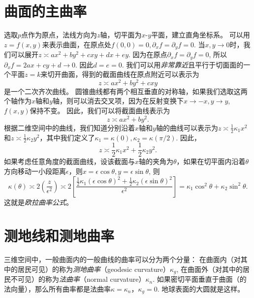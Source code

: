 \documentclass{article}
\begin{document}
\section{曲面的主曲率}

选取$p$点作为原点，法线方向为$z$轴，切平面为$x$-$y$平面，建立直角坐标系。
可以用$z=f(x,y)$来表示曲面，在原点处$f(0,0)=0, \partial_{x}f=\partial_{y}f=0$.
当$x, y\rightarrow 0$时，我们可以展开$z\asymp ax^{2}+by^{2}+cxy+dx+ey$.
因为在原点$\partial_{x}f=\partial_{y}f=0$, 所以$\partial_{x}f=2ax+cy+d\rightarrow 0$.
因此$d=e=0$.
我们可以用\emph{非常靠近}且平行于切面面的一个平面$z=k$来切开曲面，得到的截面曲线在原点附近可以表示为
\begin{equation}
    z\asymp ax^{2}+by^{2}+cxy
\end{equation}
是一个二次齐次曲线。
圆锥曲线都有两个相互垂直的对称轴，如果我们选取这两个轴作为$x$轴和$y$轴，则可以消去交叉项，因为在反射变换下$x\rightarrow -x, y\rightarrow y$, $f(x,y)$保持不变。
因此，我们可以将截面曲线表示为
\begin{equation}
    z\asymp ax^{2}+by^{2}.
\end{equation}
根据二维空间中的曲线，我们知道分别沿着$x$轴和$y$轴的曲线可以表示为$z\asymp \frac{1}{2}\kappa_{1}x^{2}$和$z\asymp \frac{1}{2}\kappa_{2}y^{2}$，其中我们定义了$\kappa_{1}=\kappa(0), \kappa_{2}=\kappa(\pi/2)$.
因此，
\begin{equation}
    z\asymp \frac{1}{2}\kappa_{1}x^{2}+\frac{1}{2}\kappa_{2}y^{2}.
\end{equation}
如果考虑任意角度的截面曲线，设该截面与$x$轴的夹角为$\theta$，如果在切平面内沿着$\theta$方向移动一小段距离$\epsilon$，则$x=\epsilon\cos\theta, y=\epsilon\sin\theta$, 则
\begin{equation}
    \kappa(\theta)
    \asymp 2\left(\frac{z}{\epsilon^{2}}\right)
    \asymp 2\left[\frac{\frac{1}{2}\kappa_{1}(\epsilon\cos\theta)^{2}+\frac{1}{2}\kappa_{2}(\epsilon\sin\theta)^{2}}{\epsilon^{2}}\right]
    =\kappa_{1}\cos^{2}\theta+\kappa_{2}\sin^{2}\theta.
\end{equation}
这就是\emph{欧拉曲率公式}。

\section{测地线和测地曲率}

三维空间中，一般曲面内的一般曲线的曲率可以分为两个分量：
在曲面内（对其中的居民可见）的称为\emph{测地曲率}（geodesic curvature）$\kappa_{g}$, 在曲面外（对其中的居民不可见）的称为\emph{法曲率}（normal curvature）$\kappa_{n}$.
如果密切平面垂直于曲面（的法向量），那么所有曲率都是法曲率$\kappa=\kappa_{n}$，$\kappa_{g}=0$.
地球表面的大圆就是这样。
\end{document}
